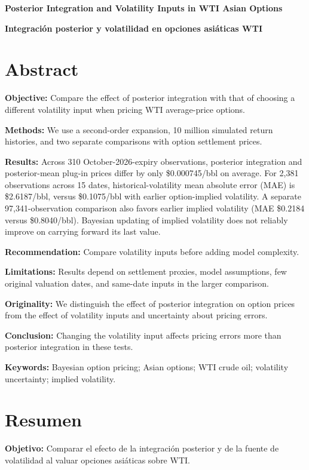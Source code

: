 \begin{center}
\textbf{Posterior Integration and Volatility Inputs in WTI Asian Options}

\textbf{Integración posterior y volatilidad en opciones asiáticas WTI}
\end{center}

\section*{Abstract}

\textbf{Objective:} Compare the effect of posterior integration with that of choosing a different volatility input when pricing WTI average-price options.

\textbf{Methods:} We use a second-order expansion, 10 million simulated return histories, and two separate comparisons with option settlement prices.

\textbf{Results:} Across 310 October-2026-expiry observations, posterior integration and posterior-mean plug-in prices differ by only \$0.000745/bbl on average. For 2,381 observations across 15 dates, historical-volatility mean absolute error (MAE) is \$2.6187/bbl, versus \$0.1075/bbl with earlier option-implied volatility. A separate 97,341-observation comparison also favors earlier implied volatility (MAE \$0.2184 versus \$0.8040/bbl). Bayesian updating of implied volatility does not reliably improve on carrying forward its last value.

\textbf{Recommendation:} Compare volatility inputs before adding model complexity.

\textbf{Limitations:} Results depend on settlement proxies, model assumptions, few original valuation dates, and same-date inputs in the larger comparison.

\textbf{Originality:} We distinguish the effect of posterior integration on option prices from the effect of volatility inputs and uncertainty about pricing errors.

\textbf{Conclusion:} Changing the volatility input affects pricing errors more than posterior integration in these tests.

\textbf{Keywords:} Bayesian option pricing; Asian options; WTI crude oil; volatility uncertainty; implied volatility.

\section*{Resumen}

\textbf{Objetivo:} Comparar el efecto de la integración posterior y de la fuente de volatilidad al valuar opciones asiáticas sobre WTI.

